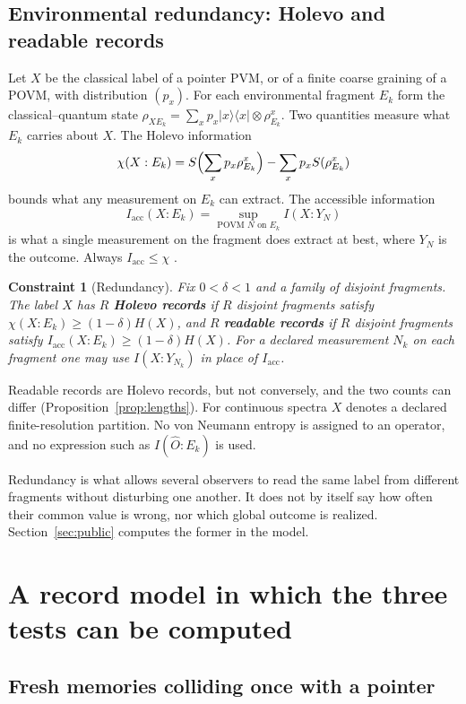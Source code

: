 \documentclass[12pt,a4paper]{article}
\newtheorem{constraint}[theorem]{Constraint}
\begin{document}
\subsection{Environmental redundancy: Holevo and readable records}

Let $X$ be the classical label of a pointer PVM, or of a finite coarse graining of a POVM, with distribution $(p_x)$. For each environmental fragment $E_k$ form the classical--quantum state $\rho_{XE_k}=\sum_xp_x|x\rangle\langle x|\otimes\rho_{E_k}^{x}$. Two quantities measure what $E_k$ carries about $X$. The Holevo information
\[
\chi(X:E_k)=S\Bigl(\sum_xp_x\rho_{E_k}^x\Bigr)-\sum_xp_xS(\rho_{E_k}^x)
\]
bounds what any measurement on $E_k$ can extract. The accessible information
\[
I_{\mathrm{acc}}(X:E_k)=\sup_{\text{POVM }N\text{ on }E_k}I(X:Y_N)
\]
is what a single measurement on the fragment does extract at best, where $Y_N$ is the outcome. Always $I_{\mathrm{acc}}\le\chi$ \cite{Holevo1973}.

\begin{constraint}[Redundancy]
\label{const:redundancy}
Fix $0<\delta<1$ and a family of disjoint fragments. The label $X$ has $R$ \textbf{Holevo records} if $R$ disjoint fragments satisfy $\chi(X:E_k)\ge(1-\delta)H(X)$, and $R$ \textbf{readable records} if $R$ disjoint fragments satisfy $I_{\mathrm{acc}}(X:E_k)\ge(1-\delta)H(X)$. For a declared measurement $N_k$ on each fragment one may use $I(X:Y_{N_k})$ in place of $I_{\mathrm{acc}}$.
\end{constraint}

Readable records are Holevo records, but not conversely, and the two counts can differ (Proposition~\ref{prop:lengths}). For continuous spectra $X$ denotes a declared finite-resolution partition. No von Neumann entropy is assigned to an operator, and no expression such as $I(\hat O:E_k)$ is used.

Redundancy is what allows several observers to read the same label from different fragments without disturbing one another. It does not by itself say how often their common value is wrong, nor which global outcome is realized. Section~\ref{sec:public} computes the former in the model.

\section{A record model in which the three tests can be computed}
\label{sec:model}

\subsection{Fresh memories colliding once with a pointer}
\end{document}
